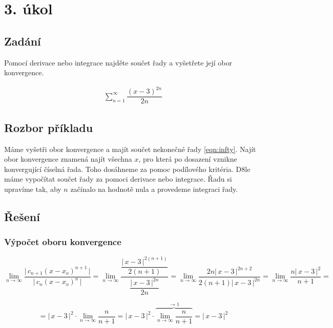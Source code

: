 \section{3. úkol}
\subsection*{Zadání}
Pomocí derivace nebo integrace najděte součet řady a vyšetřete její obor konvergence.

\begin{eqnarray}
\sum\limits_{n=1}^\infty \dfrac{(x-3)^{2n}}{2n} \label{eqn:infty}
\end{eqnarray}


\subsection*{Rozbor příkladu}
Máme vyšetři obor konvergence a majít součet nekonečné řady \ref{eqn:infty}. Najít obor konvergence znamená najít všechna $x$, pro která po dosazení vznikne konvergující číselná řada. Toho dosáhneme za pomoc podílového kritéria. D8le máme vypočítat součet řady za pomoci derivace nebo integrace. Řadu si upravíme tak, aby $n$ začínalo na hodnotě nula a provedeme integraci řady.

\subsection*{Řešení}
\subsubsection{Výpočet oboru konvergence}

\begin{displaymath}
\lim_{n \rightarrow \infty} \dfrac{\big |\,c_{n+1}(x - x_o)^{n + 1}\,\big |}{\big | \,c_n(x - x_o)^{n} \, \big |} = 
\lim_{n \rightarrow \infty}  \dfrac{\dfrac{\big |\,x - 3\, \big|^{2(n+1)}}{2(n+1)}}{\dfrac{\big | \, x-3\, \big |^{2n}}{2n}} =
\lim_{n \rightarrow \infty} \dfrac{2n \big |\,x-3\,\big |^{2n+2}}{2(n+1)\big |\,x-3\,\big |^{2n}} = 
\lim_{n \rightarrow \infty}  \frac{n\big |\,x-3\,\big |^{2}}{n+1} = 
\end{displaymath}

\begin{displaymath}
= \big |\,x-3\,\big |^{2}\cdot\lim_{n \rightarrow \infty}  \frac{n}{n+1} =
\big |\,x-3\,\big |^{2}\cdot\overbrace{\lim_{n \rightarrow \infty}  \frac{n}{n+1}}^{\rightarrow 1} = \big |\,x-3\,\big |^{2}
\end{displaymath}
\vspace{18px}

